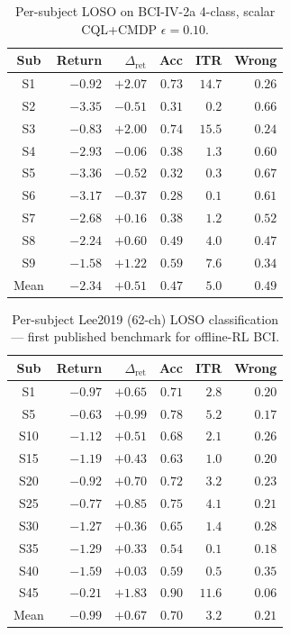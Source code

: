\documentclass[conference]{IEEEtran}
\newcommand{\bcia}{BCI-IV-2a}
\newcommand{\cql}{CQL}
\begin{document}
\begin{table}[H]
\centering
\caption{Per-subject LOSO on \bcia{} 4-class, scalar
\cql{}+CMDP $\epsilon\!=\!0.10$.}
\label{tab:app:bci2a_loso}
\footnotesize
\setlength{\tabcolsep}{3pt}
\begin{tabular}{c r r r r r}
\toprule
Sub & Return & $\Delta_{\text{ret}}$ & Acc & ITR & Wrong \\
\midrule
S1 & $-0.92$ & $\mathbf{+2.07}$ & $0.73$ & $14.7$ & $0.26$ \\
S2 & $-3.35$ & $-0.51$ & $0.31$ & $0.2$ & $0.66$ \\
S3 & $-0.83$ & $\mathbf{+2.00}$ & $0.74$ & $15.5$ & $0.24$ \\
S4 & $-2.93$ & $-0.06$ & $0.38$ & $1.3$ & $0.60$ \\
S5 & $-3.36$ & $-0.52$ & $0.32$ & $0.3$ & $0.67$ \\
S6 & $-3.17$ & $-0.37$ & $0.28$ & $0.1$ & $0.61$ \\
S7 & $-2.68$ & $\mathbf{+0.16}$ & $0.38$ & $1.2$ & $0.52$ \\
S8 & $-2.24$ & $\mathbf{+0.60}$ & $0.49$ & $4.0$ & $0.47$ \\
S9 & $-1.58$ & $\mathbf{+1.22}$ & $0.59$ & $7.6$ & $0.34$ \\
\midrule
Mean & $-2.34$ & $+0.51$ & $0.47$ & $5.0$ & $0.49$ \\
\bottomrule
\end{tabular}
\end{table}

\begin{table}[H]
\centering
\caption{Per-subject Lee2019 (62-ch) LOSO classification ---
first published benchmark for offline-RL BCI.}
\label{tab:app:lee2019_loso}
\footnotesize
\setlength{\tabcolsep}{3pt}
\begin{tabular}{c r r r r r}
\toprule
Sub & Return & $\Delta_{\text{ret}}$ & Acc & ITR & Wrong \\
\midrule
S1  & $-0.97$ & $\mathbf{+0.65}$ & $0.71$ & $2.8$  & $0.20$ \\
S5  & $-0.63$ & $\mathbf{+0.99}$ & $0.78$ & $5.2$  & $0.17$ \\
S10 & $-1.12$ & $\mathbf{+0.51}$ & $0.68$ & $2.1$  & $0.26$ \\
S15 & $-1.19$ & $\mathbf{+0.43}$ & $0.63$ & $1.0$  & $0.20$ \\
S20 & $-0.92$ & $\mathbf{+0.70}$ & $0.72$ & $3.2$  & $0.23$ \\
S25 & $-0.77$ & $\mathbf{+0.85}$ & $0.75$ & $4.1$  & $0.21$ \\
S30 & $-1.27$ & $\mathbf{+0.36}$ & $0.65$ & $1.4$  & $0.28$ \\
S35 & $-1.29$ & $\mathbf{+0.33}$ & $0.54$ & $0.1$  & $0.18$ \\
S40 & $-1.59$ & $\mathbf{+0.03}$ & $0.59$ & $0.5$  & $0.35$ \\
S45 & $-0.21$ & $\mathbf{+1.83}$ & $0.90$ & $11.6$ & $0.06$ \\
\midrule
Mean & $-0.99$ & $+0.67$ & $0.70$ & $3.2$ & $0.21$ \\
\bottomrule
\end{tabular}
\end{table}
\end{document}
